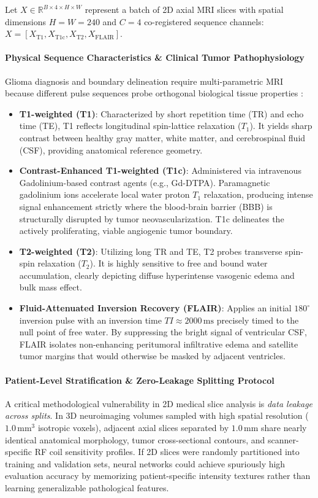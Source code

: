 \documentclass{article}
\begin{document}
Let $X \in \mathbb{R}^{B \times 4 \times H \times W}$ represent a batch of 2D axial MRI slices with spatial dimensions $H = W = 240$ and $C = 4$ co-registered sequence channels: $X = [X_{\text{T1}}, X_{\text{T1c}}, X_{\text{T2}}, X_{\text{FLAIR}}]$. 

\paragraph{Physical Sequence Characteristics \& Clinical Tumor Pathophysiology}
Glioma diagnosis and boundary delineation require multi-parametric MRI because different pulse sequences probe orthogonal biological tissue properties \citep{brats2024}:
\begin{itemize}
    \item \textbf{T1-weighted (T1)}: Characterized by short repetition time (TR) and echo time (TE), T1 reflects longitudinal spin-lattice relaxation ($T_1$). It yields sharp contrast between healthy gray matter, white matter, and cerebrospinal fluid (CSF), providing anatomical reference geometry.
    \item \textbf{Contrast-Enhanced T1-weighted (T1c)}: Administered via intravenous Gadolinium-based contrast agents (e.g., Gd-DTPA). Paramagnetic gadolinium ions accelerate local water proton $T_1$ relaxation, producing intense signal enhancement strictly where the blood-brain barrier (BBB) is structurally disrupted by tumor neovascularization. T1c delineates the actively proliferating, viable angiogenic tumor boundary.
    \item \textbf{T2-weighted (T2)}: Utilizing long TR and TE, T2 probes transverse spin-spin relaxation ($T_2$). It is highly sensitive to free and bound water accumulation, clearly depicting diffuse hyperintense vasogenic edema and bulk mass effect.
    \item \textbf{Fluid-Attenuated Inversion Recovery (FLAIR)}: Applies an initial $180^\circ$ inversion pulse with an inversion time $TI \approx 2000\,\text{ms}$ precisely timed to the null point of free water. By suppressing the bright signal of ventricular CSF, FLAIR isolates non-enhancing peritumoral infiltrative edema and satellite tumor margins that would otherwise be masked by adjacent ventricles.
\end{itemize}

\paragraph{Patient-Level Stratification \& Zero-Leakage Splitting Protocol}
A critical methodological vulnerability in 2D medical slice analysis is \emph{data leakage across splits}. In 3D neuroimaging volumes sampled with high spatial resolution ($1.0\,\text{mm}^3$ isotropic voxels), adjacent axial slices separated by $1.0\,\text{mm}$ share nearly identical anatomical morphology, tumor cross-sectional contours, and scanner-specific RF coil sensitivity profiles. If 2D slices were randomly partitioned into training and validation sets, neural networks could achieve spuriously high evaluation accuracy by memorizing patient-specific intensity textures rather than learning generalizable pathological features.
\end{document}
